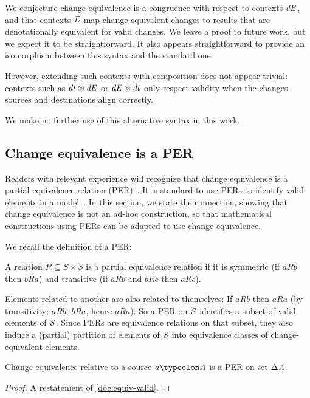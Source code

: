 We conjecture change equivalence is a congruence with respect to
contexts \ensuremath{\Varid{dE}}, and that contexts \ensuremath{\Conid{E}} map change-equivalent
changes to results that are denotationally equivalent for valid
changes. We leave a proof to future work, but we expect it to be
straightforward. It also appears straightforward to provide an
isomorphism between this syntax and the standard one.

However, extending such contexts with composition does not appear
trivial: contexts such as \ensuremath{\Varid{dt}\circledcirc \Varid{dE}} or \ensuremath{\Varid{dE}\circledcirc \Varid{dt}} only respect validity when the changes sources and
destinations align correctly.

We make no further use of this alternative syntax in this work.

\subsection{Change equivalence is a PER}
\label{sec:doe-per}
Readers with relevant experience will recognize that change
equivalence is a partial equivalence relation
(PER)~\citep[Ch.~5]{Mitchell1996foundations}. It is standard to use PERs to
identify valid elements in a
model~\citep{Harper1992constructing}. In this section, we state
the connection, showing that change equivalence is not an ad-hoc
construction, so that mathematical constructions using PERs can
be adapted to use change equivalence.

We recall the definition of a PER:
\begin{definition}
  A relation $R \subseteq S \times S$ is a partial equivalence
  relation if it is symmetric (if $a R b$ then $b R a$) and
  transitive (if $a R b$ and $b R c$ then $a R c$).
\end{definition}
Elements related to another are also related to themselves: If
$aRb$ then $aRa$ (by transitivity: $aRb$, $bRa$, hence $aRa$). So
a PER on \ensuremath{\Conid{S}} identifies a subset of valid elements of \ensuremath{\Conid{S}}. Since
PERs are equivalence relations on that subset, they also induce a
(partial) partition of elements of \ensuremath{\Conid{S}} into equivalence classes
of change-equivalent elements.

\begin{lemma}
  Change equivalence relative to a source \ensuremath{\Varid{a}\typcolon\Conid{A}} is a PER on set \ensuremath{\Delta \Conid{A}}.
\end{lemma}
\begin{proof}
A restatement of \cref{doe:equiv-valid}.
\end{proof}


